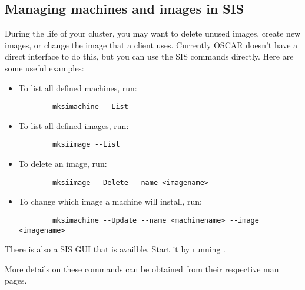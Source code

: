 %
%
%

\subsection{Managing machines and images in SIS}
\label{app:troubleshooting-machines-images}

During the life of your cluster, you may want to delete unused
images, create new images, or change the image that a
client uses.  Currently OSCAR doesn't have a direct interface to do
this, but you can use the SIS commands directly. Here are some useful
examples:

\begin{itemize}
\item To list all defined machines, run:
\begin{verbatim}
        mksimachine --List
\end{verbatim}
\item To list all defined images, run:
\begin{verbatim}
        mksiimage --List
\end{verbatim}
\item To delete an image, run:
\begin{verbatim}
        mksiimage --Delete --name <imagename>
\end{verbatim}
\item To change which image a machine will install, run:
\begin{verbatim}
        mksimachine --Update --name <machinename> --image <imagename>
\end{verbatim}
\end{itemize}

There is also a SIS GUI that is availble. Start it by running
. 

More details on these commands can be obtained from their respective
man pages.

